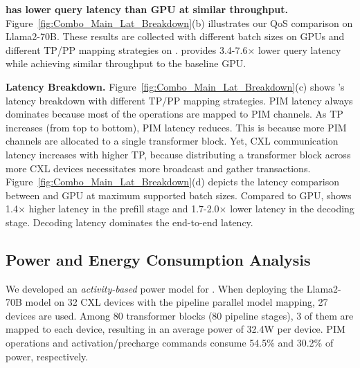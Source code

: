 \textbf{\att{} has lower query latency than GPU at similar throughput.}
Figure~\ref{fig:Combo_Main_Lat_Breakdown}(b) illustrates our QoS comparison on Llama2-70B.
These results are collected with different batch sizes on GPUs and different TP/PP mapping strategies on \att{}.
\att{} provides 3.4-7.6$\times$ lower query latency while achieving similar throughput to the baseline GPU.

\textbf{Latency Breakdown.} Figure~\ref{fig:Combo_Main_Lat_Breakdown}(c) shows \att{}'s latency breakdown with different TP/PP mapping strategies.
PIM latency always dominates because most of the operations are mapped to PIM channels. As TP increases (from top to bottom), PIM latency reduces.
This is because more PIM channels are allocated to a single transformer block.
Yet, CXL communication latency increases with higher TP, because distributing a transformer block across more CXL devices necessitates more broadcast and gather transactions. 
Figure~\ref{fig:Combo_Main_Lat_Breakdown}(d) depicts the latency comparison between \att{} and GPU at maximum supported batch sizes.  
Compared to GPU, \att{} shows 1.4$\times$ higher latency in the prefill stage and 1.7-2.0$\times$ lower latency in the decoding stage. Decoding latency dominates the end-to-end latency.




\subsection{Power and Energy Consumption Analysis}\label{subsec:power_results}

We developed an \textit{activity-based} power model for \att{}. 
When deploying the Llama2-70B model on 32 CXL devices with the pipeline parallel model mapping, 27 devices are used. Among 80 transformer blocks (80 pipeline stages), 3 of them are mapped to each device, resulting in an average power of 32.4W per device. PIM operations and activation/precharge commands consume 54.5\% and 30.2\% of power, respectively.

